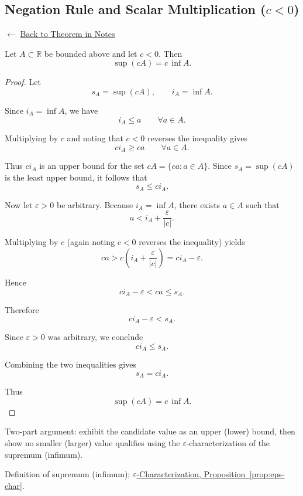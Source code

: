 
\subsection*{Negation Rule and Scalar Multiplication ($c < 0$)}
\label{prf:supremum-infimum-swap}

\begin{remark*}[Return]
$\leftarrow$ \hyperref[thm:neg-rule]{Back to Theorem in Notes}
\end{remark*}

\begin{theorem}
Let $A \subset \mathbb{R}$ be bounded above and let $c<0$.
Then
\[
\sup(cA)=c\,\inf A .
\]
\end{theorem}

\begin{proof}
Let
\[
s_A = \sup(cA), \qquad i_A = \inf A .
\]

Since $i_A=\inf A$, we have
\[
i_A \le a \qquad \forall a \in A.
\]

Multiplying by $c$ and noting that $c<0$ reverses the inequality gives
\[
c i_A \ge c a \qquad \forall a \in A.
\]

Thus $c i_A$ is an upper bound for the set $cA=\{ca : a\in A\}$.
Since $s_A=\sup(cA)$ is the least upper bound, it follows that
\[
s_A \le c i_A.
\]

Now let $\varepsilon>0$ be arbitrary. Because $i_A=\inf A$, there exists
$a\in A$ such that
\[
a < i_A + \frac{\varepsilon}{|c|}.
\]

Multiplying by $c$ (again noting $c<0$ reverses the inequality) yields
\[
c a > c\!\left(i_A + \frac{\varepsilon}{|c|}\right)
     = c i_A - \varepsilon .
\]

Hence
\[
c i_A - \varepsilon < c a \le s_A .
\]

Therefore
\[
c i_A - \varepsilon < s_A .
\]

Since $\varepsilon>0$ was arbitrary, we conclude
\[
c i_A \le s_A .
\]

Combining the two inequalities gives
\[
s_A = c i_A .
\]

Thus
\[
\sup(cA)=c\,\inf A.
\]
\end{proof}

\begin{remark*}
Two-part argument: exhibit the candidate value as an upper (lower) bound,
then show no smaller (larger) value qualifies using the
$\varepsilon$-characterization of the supremum (infimum).
\end{remark*}

\begin{remark*}[Dependencies]
Definition of supremum (infimum); \hyperref[prop:eps-char]{$\varepsilon$-Characterization, Proposition~\ref*{prop:eps-char}}.
\end{remark*}
